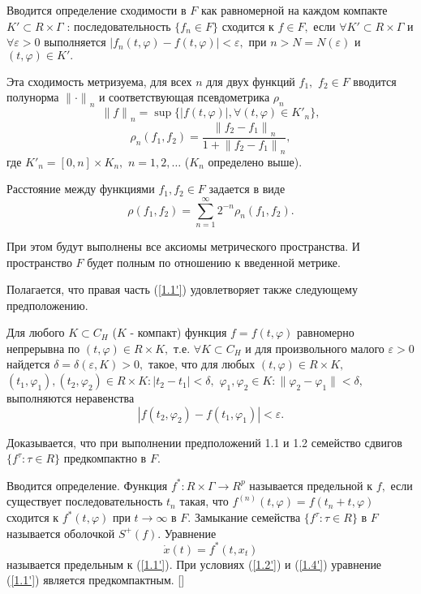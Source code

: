 	Вводится определение сходимости в $F$ как равномерной на каждом компакте
	$K'\subset R\times \Gamma $ : последовательность
	$\{f_n\in F\}$ сходится к $f\in F,$ если $\forall K'\subset
	R\times\Gamma $ и $\forall \varepsilon >0$ выполняется $|f_n(t,\varphi
	)-f(t,\varphi )|<\varepsilon,$ при $n>N=N(\varepsilon )$ и
	$(t,\varphi )\in K'.$
	
	Эта сходимость метризуема, для всех $n$ для двух функций $f_1,$
	$f_2\in F$ вводится полунорма ${\|\cdot \|}_n$ и соответствующая
	псевдометрика $\rho _n$  $${\| f\|
	}_n=\sup{\{|f(t,\varphi )|, \forall (t,\varphi )\in {K'}_n\} },$$
	$$\rho _n(f_1,f_2)=\frac{{\| f_2-f_1\| }_n}{1+{\| f_2-f_1\|
		}_n},$$ \noindent где ${K'}_n=[0,n]\times K_n,$ $n=1,2,\ldots $
	($K_n$ определено выше).
	
	Расстояние между функциями $f_1, f_2\in F$ задается в виде
	$$\rho (f_1,f_2)=\sum_{n=1}^{\infty }{2^{-n}\rho _n(f_1,f_2)}.
	\label{1.3'}$$
	
	При этом будут выполнены все аксиомы
	метрического пространства. И пространство
	$F$ будет полным по отношению к введенной метрике.
	
	Полагается,  что правая  часть   (\ref{1.1'})   удовлетворяет   также
	следующему предположению.
	
	Для любого $K\subset C_H$ ($K$ - компакт)
		функция $f=f(t,\varphi )$ равномерно непрерывна по
		$(t, \varphi )\in R\times K,$ т.е. $\forall K\subset C_H$ и для произвольного малого $\varepsilon
		>0$ найдется $\delta =\delta (\varepsilon ,K)>0,$ такое, что для
		любых $(t,\varphi)\in R\times K,$ $(t_1,\varphi _1),
		(t_2,\varphi _2)\in R\times K: |t_2-t_1|<\delta,$ $\varphi _1,
		\varphi _2\in K:\|\varphi _2-\varphi _1\|<\delta,$ выполняются
		неравенства
		\begin{equation}
		|f(t_2,\varphi _2)-f(t_1,\varphi
		_1)|<\varepsilon. \label{1.4'}
		\end{equation}
	
	Доказывается, что при выполнении предположений 1.1 и 1.2
		семейство сдвигов $\{f^{\tau }:\tau\in R\}$
		предкомпактно в $F.$
	
	Вводится определение. Функция $f^*:R\times\Gamma \to R^p$ называется предельной
		к $f,$ если существует  последовательность ${t_n}$
		такая,  что ${f^{(n)}(t,\varphi )=f(t_n+t,\varphi )}$ сходится к
		$f^*(t,\varphi )$ при $t \to \infty$ в $F.$ Замыкание семейства $\{f^{\tau }:\tau \in
		R\}$ в $F$ называется оболочкой $S^+(f).$ Уравнение
		\begin{equation}
		\dot x(t)=f^*(t,x_t) \label{1.5'}
		\end{equation}
		называется предельным к (\ref{1.1'}).
	При  условиях (\ref{1.2'}) и (\ref{1.4'})
	уравнение  (\ref{1.1'}) является предкомпактным. []
	
